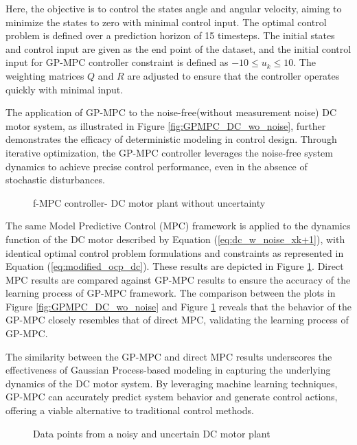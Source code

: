  Here, the objective is to control the states angle and angular velocity, aiming to minimize the states to zero with minimal control input. The optimal control problem is defined over a prediction horizon of 15 timesteps. The initial states and control input are given as the end point of the dataset, and the initial control input for GP-MPC controller constraint is defined as $-10 \leq u_k \leq 10$. The weighting matrices $Q$ and $R$ are adjusted to ensure that the controller operates quickly with minimal input.


The application of GP-MPC to the noise-free(without measurement noise) DC motor system, as illustrated in Figure \ref{fig:GPMPC_DC_wo_noise}, further demonstrates the efficacy of deterministic modeling in control design. Through iterative optimization, the GP-MPC controller leverages the noise-free system dynamics to achieve precise control performance, even in the absence of stochastic disturbances.

\begin{figure}
    \centering
    
    \caption{f-MPC controller- DC motor plant without uncertainty}
    \label{fig:fmpc_dc_wo_noise}
\end{figure}

The same Model Predictive Control (MPC) framework is applied to the dynamics function of the DC motor described by Equation (\ref{eq:dc_w_noise_xk+1}), with identical optimal control problem formulations and constraints as represented in Equation (\ref{eq:modified_ocp_dc}). These results are depicted in Figure \ref{fig:fmpc_dc_wo_noise}. Direct MPC results are compared against GP-MPC results to ensure the accuracy of the learning process of GP-MPC framework. The comparison between the plots in Figure \ref{fig:GPMPC_DC_wo_noise} and Figure \ref{fig:fmpc_dc_wo_noise} reveals that the behavior of the GP-MPC closely resembles that of direct MPC, validating the learning process of GP-MPC.

The similarity between the GP-MPC and direct MPC results underscores the effectiveness of Gaussian Process-based modeling in capturing the underlying dynamics of the DC motor system. By leveraging machine learning techniques, GP-MPC can accurately predict system behavior and generate control actions, offering a viable alternative to traditional control methods.

\begin{figure}
    \centering
    
    \caption{Data points from a noisy and uncertain DC motor plant}
    \label{fig:data_points_with_noise}
\end{figure}

